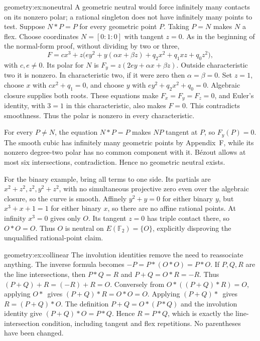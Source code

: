 \begin{solution}{geometry:ex:noneutral}
\idea A geometric neutral would force infinitely many contacts on its nonzero polar; a rational singleton does not have infinitely many points to test.
\writeup Suppose $N*P=P$ for every geometric point $P$. Taking $P=N$ makes $N$ a flex. Choose coordinates $N=[0:1:0]$ with tangent $z=0$. As in the beginning of the normal-form proof, without dividing by two or three,
\[
F=cx^3+z\bigl(ey^2+y(\alpha x+\beta z)+q_2x^2+q_1xz+q_0z^2\bigr),
\]
with $c,e\ne0$. Its polar for $N$ is $F_y=z(2ey+\alpha x+\beta z)$. Outside characteristic two it is nonzero. In characteristic two, if it were zero then $\alpha=\beta=0$. Set $z=1$, choose $x$ with $cx^2+q_1=0$, and choose $y$ with $ey^2+q_2x^2+q_0=0$. Algebraic closure supplies both roots. These equations make $F_x=F_y=F_z=0$, and Euler's identity, with $3=1$ in this characteristic, also makes $F=0$. This contradicts smoothness. Thus the polar is nonzero in every characteristic.

For every $P\ne N$, the equation $N*P=P$ makes $NP$ tangent at $P$, so $F_y(P)=0$. The smooth cubic has infinitely many geometric points by Appendix~F, while its nonzero degree-two polar has no common component with it. B\'ezout allows at most six intersections, contradiction. Hence no geometric neutral exists.

For the binary example, bring all terms to one side. Its partials are $x^2+z^2,z^2,y^2+z^2$, with no simultaneous projective zero even over the algebraic closure, so the curve is smooth. Affinely $y^2+y=0$ for either binary $y$, but $x^3+x+1=1$ for either binary $x$, so there are no affine rational points. At infinity $x^3=0$ gives only $O$. Its tangent $z=0$ has triple contact there, so $O*O=O$. Thus $O$ is neutral on $E(\mathbb F_2)=\{O\}$, explicitly disproving the unqualified rational-point claim.
\end{solution}
\begin{solution}{geometry:ex:collinear}
\idea The involution identities remove the need to reassociate anything.
\writeup The inverse formula becomes $-P=P*(O*O)=P*O$. If $P,Q,R$ are the line intersections, then $P*Q=R$ and $P+Q=O*R=-R$. Thus $(P+Q)+R=(-R)+R=O$. Conversely from $O*((P+Q)*R)=O$, applying $O*\,$ gives $(P+Q)*R=O*O=O$. Applying $(P+Q)*\,$ gives $R=(P+Q)*O$. The definition $P+Q=O*(P*Q)$ and the involution identity give $(P+Q)*O=P*Q$. Hence $R=P*Q$, which is exactly the line-intersection condition, including tangent and flex repetitions. No parentheses have been changed.
\end{solution}
